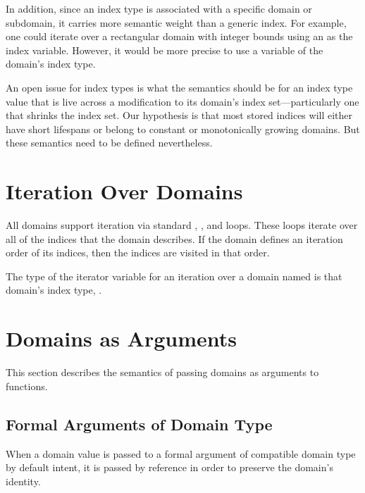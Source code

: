 In addition, since an index type is associated with a specific domain or subdomain, it
carries more semantic weight than a generic index.  For example, one could
iterate over a rectangular domain with integer bounds using an  as
the index variable.  However, it would be more precise to use a variable of the
domain's index type.

\begin{openissue}

An open issue for index types is what the semantics should be for an
index type value that is live across a modification to its domain's
index set---particularly one that shrinks the index set.  Our
hypothesis is that most stored indices will either have short
lifespans or belong to constant or monotonically growing domains.  But
these semantics need to be defined nevertheless.

\end{openissue}

\section{Iteration Over Domains}
\label{Iteration_over_Domains}

All domains support iteration via standard , , and 
loops.  These loops iterate over all of the indices that the domain
describes.  If the domain defines an iteration order of its indices,
then the indices are visited in that order.  

The type of the iterator variable for an iteration over a
domain named  is that domain's index type, .


\section{Domains as Arguments}
\label{Domain_Arguments}

This section describes the semantics of passing domains as arguments
to functions.

\subsection{Formal Arguments of Domain Type}

When a domain value is passed to a formal argument of compatible
domain type by default intent, it is passed by reference in order to
preserve the domain's identity.


